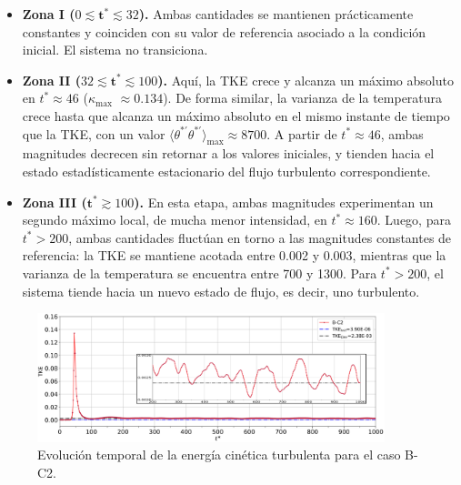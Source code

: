 \begin{itemize}

  \item \textbf{Zona I ($0 \lesssim \mathbf{t^*} \lesssim 32$).} Ambas cantidades se mantienen prácticamente constantes y coinciden con su valor de referencia asociado a la condición inicial. El sistema no transiciona.

  \item \textbf{Zona II ($32 \lesssim \mathbf{t^*} \lesssim 100$).} Aquí, la TKE crece y alcanza un máximo absoluto en $t^* \approx 46$ ($\kappa_{\text{max}}$ $\approx 0\text{.}134$). De forma similar, la varianza de la temperatura crece hasta que alcanza un máximo absoluto en el mismo instante de tiempo que la TKE, con un valor $\langle \theta^{*\prime} \theta^{*\prime}\rangle_{\text{max}} \approx 8700$. A partir de $t^* \approx 46$, ambas magnitudes decrecen sin retornar a los valores iniciales, y tienden hacia el estado estadísticamente estacionario del flujo turbulento correspondiente.
  
  \item \textbf{Zona III ($\mathbf{t^*} \gtrsim 100$).} En esta etapa, ambas magnitudes experimentan un segundo máximo local, de mucha menor intensidad, en $t^* \approx 160$. Luego, para $t^* > 200$, ambas cantidades fluctúan en torno a las magnitudes constantes de referencia: la TKE se mantiene acotada entre 0.002 y 0.003, mientras que la varianza de la temperatura se encuentra entre 700 y 1300. Para $t^* >200$, el sistema tiende hacia un nuevo estado de flujo, es decir, uno turbulento. 

\end{itemize}


\begin{figure}[H]
  \centering  
    \includegraphics[width=0.9\textwidth]{figures/cap6/B-C2/Cases_Comp_tke.eps}
   \caption{Evolución temporal de la energía cinética turbulenta para el caso B-C2.}
    \label{fig:tke-bc2}
\end{figure}

\newpage

